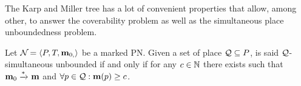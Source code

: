 %
%
%
%
%
%
%
%
%

The Karp and Miller tree has a lot of convenient properties that allow, among other, to answer the coverability problem as well as the simultaneous place unboundedness problem.

\begin{defi}
  Let $\mathcal{N}_{} = \left\langle P_{}, T_{}, \mathbf{m}_{0,}\right\rangle$ be a marked \ac{PN}.
  Given a set of place $\mathcal{Q} \subseteq P$, \namePN is said $\mathcal{Q}$-simultaneous unbounded if and only if for any $c \in \mathbb{N}$ there exists \mar such that $\mathbf{m}_0 \xrightarrow{*}_{} \mathbf{m}$ and $\forall p \in \mathcal{Q} : \mathbf{m}(p) \geq c$.
\end{defi}

